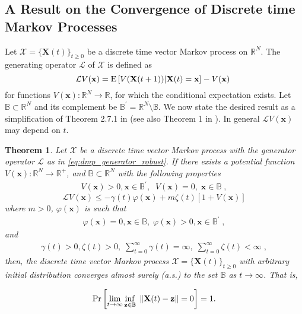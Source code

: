 \documentclass[onecolumn, draft, 12pt]{IEEEtran}
\newcommand{\E}{{\rm E}}
\newcommand{\Cs}{\mathbb{B}}
\newcommand{\Bs}{\Cs}
\newcommand{\Cprime}{\Cs^{'}}
\newcommand{\R}{\mathbb{R}}
\newcommand{\Rn}{\mathbb{R}^{N}}
\newcommand{\Lg}{\mathcal{L}}
\newcommand{\dmp}{\mathcal{X}}
\newcommand{\X}{\mathbf{X}}
\newcommand{\xX}{\mathbf{x}}
\newcommand{\Z}{\mathbf{z}}
\newcommand{\vX}{ V(\mathbf{x})}
\newcommand{\vecXtone}{ V(\mathbf{X}(t+1))}
\newcommand{\fitX}{ \varphi(\mathbf{x})}
\newtheorem{thm}{Theorem}
\begin{document}
\subsection{A Result on the Convergence of Discrete time Markov Processes}\label{subsec:conv_res_dmp_robust}
Let $\dmp=\{\X(t)\}_{t \geq 0}$ be a discrete time vector Markov process on $\Rn$. The generating operator $\Lg$ of $\dmp$ is defined as
\begin{equation} \label{eq:dmp_generator_robust}
\Lg \vX = \E \left[ \vecXtone |\X(t)=\xX \right] - \vX \;
\end{equation}
for functions $\vX : \Rn \rightarrow \R$, for which the conditional expectation exists. Let $\Bs \subset \Rn$ and its complement be $\Cprime = \Rn \setminus \Bs$. We now state the desired result as a simplification of Theorem 2.7.1 in \cite{Nevelson1973} (see also Theorem 1 in \cite{KarMoura2009}). In general $\Lg \vX$ may depend on $t$. 

\begin{thm} \label{nld_conv_dmp_res_thm_robust}
Let $\dmp$ be a discrete time vector Markov process with the generator operator $\Lg$ as in \eqref{eq:dmp_generator_robust}. If there exists a potential function $\vX : \Rn \rightarrow \R^{+}$, and $\Bs \subset \Rn$ with the following properties
\begin{align}
\label{eq:nld_conv_dmp_res_thm1_robust}
\vX  > 0,  \xX \in \Cprime, \;\; \vX  = 0,   \;  \xX \in \Bs \;,
\end{align}
\begin{equation} \label{eq:nld_conv_dmp_res_thm4_robust}
\Lg \vX \leq - \gamma(t) \fitX + m \zeta(t) [1+ \vX]
\end{equation}
where $m>0$, $\fitX$ is such that
\begin{align}
\label{eq:nld_conv_dmp_res_thm4a_robust}
\fitX =0, \xX \in \Bs, \;  \fitX  > 0, \xX \in \Cprime \;,
\end{align}
and
\begin{align}
\label{eq:nld_conv_dmp_res_thm6_robust}
\gamma(t)  > 0, \zeta(t)  > 0, \; \displaystyle\sum_{t=0}^{\infty} \gamma(t) =  \infty, \; \displaystyle\sum_{t=0}^{\infty} \zeta(t) < \infty \;,
\end{align}
then, the discrete time vector Markov process $\dmp=\{\X(t)\}_{t \geq 0}$ with arbitrary initial distribution converges almost surely (a.s.) to the set $\Bs$ as $t \rightarrow \infty$. That is,

\begin{equation} \label{eq:nld_conv_dmp_res_thm8_robust}
{\rm Pr}\left[ \lim_{t \rightarrow \infty} \inf_{\Z \in \Bs} \; \| \X(t) - \Z \| =0 \right]=1.
\end{equation}
\end{thm}
\end{document}

